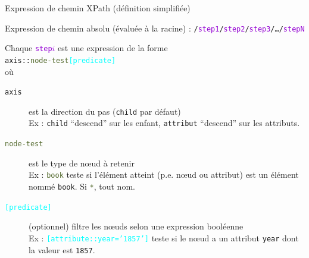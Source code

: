 \begin{frame}{Expression de chemin XPath (définition simplifiée)}

Expression de \alert{chemin absolu} (évaluée à la racine) : 
\texttt{/\textcolor{DarkViolet}{step1}/\textcolor{DarkViolet}{step2}/\textcolor{DarkViolet}{step3}/…/\textcolor{DarkViolet}{stepN}}
\\

\medskip 

\noindent Chaque \texttt{\textcolor{DarkViolet}{step$i$}} est une expression de la forme \\
\texttt{\textcolor{indiaRed}{axis}::\textcolor{DarkOliveGreen}{node-test}\textcolor{cyan}{[predicate]}
}\\
 o\`u

\begin{description}
\item[\texttt{\textcolor{indiaRed}{axis}}] est la direction du pas (\texttt{\textcolor{indiaRed}{child}}  par défaut)\\
Ex : \texttt{\textcolor{indiaRed}{child}} ``descend'' sur les enfant, \texttt{\textcolor{indiaRed}{attribut}} ``descend'' sur les attributs.
\item[\texttt{\textcolor{DarkOliveGreen}{node-test}}] est le type de nœud à retenir\\
Ex : \texttt{\textcolor{DarkOliveGreen}{book}} teste si l'élément atteint (p.e. nœud ou attribut) est un élément nommé \texttt{book}.
Si \texttt{\textcolor{DarkOliveGreen}{*}},  tout nom.
\item[\texttt{\textcolor{cyan}{[predicate]}}] (optionnel) filtre les nœuds selon une expression booléenne \\
	Ex : \texttt{\textcolor{cyan}{[attribute::year='1857']}} teste si le nœud a un attribut \texttt{year} dont la valeur est \texttt{1857}.\\
\end{description}

\end{frame}

